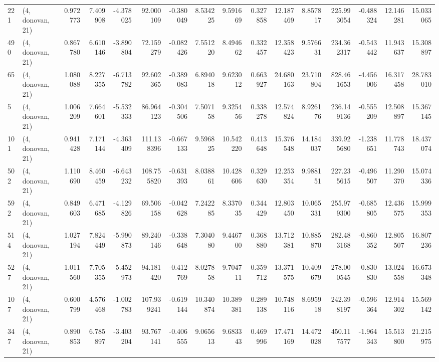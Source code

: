 \begin{tabular}{llrrrrrrrrrrrrrr}
221 &  (4, donovan, 21) &   0.972773 &   7.409908 &  -4.378025 &    92.000109 &  -0.380049 &   8.534225 &   9.591669 &  0.327858 &  12.187469 &   8.857817 &    225.993054 &  -0.488324 &   12.146281 &   15.033065 \\
490 &  (4, donovan, 21) &   0.867780 &   6.610146 &  -3.890804 &    72.159279 &  -0.082426 &   7.551220 &   8.494662 &  0.332457 &  12.358423 &   9.576631 &    234.362317 &  -0.543442 &   11.943637 &   15.308897 \\
65  &  (4, donovan, 21) &   1.080088 &   8.227355 &  -6.713782 &    92.602365 &  -0.389083 &   6.894018 &   9.623012 &  0.663927 &  24.680163 &  23.710804 &    828.461653 &  -4.456006 &   16.317458 &   28.783010 \\
5   &  (4, donovan, 21) &   1.006209 &   7.664601 &  -5.532333 &    86.964123 &  -0.304506 &   7.507158 &   9.325456 &  0.338278 &  12.574824 &   8.926176 &    236.149136 &  -0.555209 &   12.508897 &   15.367145 \\
101 &  (4, donovan, 21) &   0.941428 &   7.171144 &  -4.363409 &   111.138396 &  -0.667133 &   9.596825 &  10.542220 &  0.413648 &  15.376548 &  14.184037 &    339.925680 &  -1.238651 &   11.778743 &   18.437074 \\
502 &  (4, donovan, 21) &   1.110690 &   8.460459 &  -6.643232 &   108.755820 &  -0.631393 &   8.038861 &  10.428606 &  0.329630 &  12.253354 &   9.988151 &    227.235615 &  -0.496507 &   11.290370 &   15.074336 \\
592 &  (4, donovan, 21) &   0.849603 &   6.471685 &  -4.129826 &    69.506158 &  -0.042628 &   7.242285 &   8.337035 &  0.344429 &  12.803450 &  10.065331 &    255.979300 &  -0.685805 &   12.436575 &   15.999353 \\
514 &  (4, donovan, 21) &   1.027194 &   7.824449 &  -5.990873 &    89.240146 &  -0.338648 &   7.304080 &   9.446700 &  0.368880 &  13.712381 &  10.885870 &    282.483168 &  -0.860352 &   12.805507 &   16.807236 \\
527 &  (4, donovan, 21) &   1.011560 &   7.705355 &  -5.452973 &    94.181420 &  -0.412769 &   8.027858 &   9.704711 &  0.359712 &  13.371575 &  10.409679 &    278.000545 &  -0.830830 &   13.024558 &   16.673348 \\
107 &  (4, donovan, 21) &   0.600799 &   4.576468 &  -1.002783 &   107.939241 &  -0.619144 &  10.340874 &  10.389381 &  0.289138 &  10.748116 &   8.695918 &    242.398197 &  -0.596364 &   12.914302 &   15.569142 \\
347 &  (4, donovan, 21) &   0.890853 &   6.785897 &  -3.403204 &    93.767141 &  -0.406555 &   9.065613 &   9.683343 &  0.469996 &  17.471169 &  14.472028 &    450.117577 &  -1.964343 &   15.513800 &   21.215975 \\

\end{tabular}
